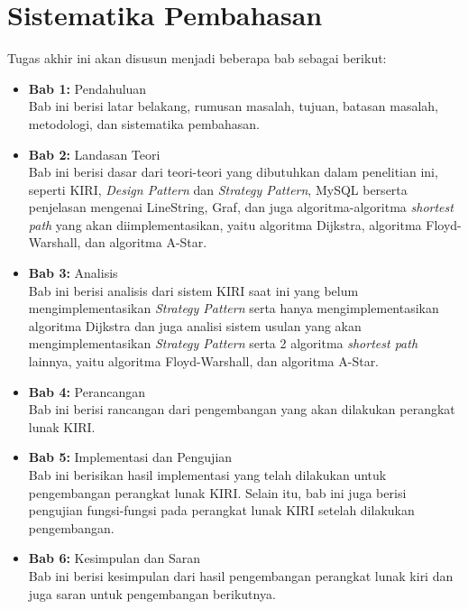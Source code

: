 \section{Sistematika Pembahasan}
\label{sec:sispem}
Tugas akhir ini akan disusun menjadi beberapa bab sebagai berikut:
\begin{itemize}
    \item \textbf{Bab 1:} Pendahuluan
    \\ Bab ini berisi latar belakang, rumusan masalah, tujuan, batasan masalah, metodologi, dan sistematika pembahasan.
    \item \textbf{Bab 2:} Landasan Teori
    \\ Bab ini berisi dasar dari teori-teori yang dibutuhkan dalam penelitian ini, seperti KIRI, \textit{Design Pattern} dan \textit{Strategy Pattern}, MySQL berserta penjelasan mengenai LineString, Graf, dan juga algoritma-algoritma \textit{shortest path} yang akan diimplementasikan, yaitu algoritma Dijkstra, algoritma Floyd-Warshall, dan algoritma A-Star.
    \item \textbf{Bab 3:} Analisis
    \\ Bab ini berisi analisis dari sistem KIRI saat ini yang belum mengimplementasikan \textit{Strategy Pattern} serta hanya mengimplementasikan algoritma Dijkstra dan juga analisi sistem usulan yang akan mengimplementasikan \textit{Strategy Pattern} serta 2 algoritma \textit{shortest path} lainnya, yaitu algoritma Floyd-Warshall, dan algoritma A-Star. 
    \item \textbf{Bab 4:} Perancangan
    \\ Bab ini berisi rancangan dari pengembangan yang akan dilakukan perangkat lunak KIRI.
    \item \textbf{Bab 5:} Implementasi dan Pengujian
    \\ Bab ini berisikan hasil implementasi yang telah dilakukan untuk pengembangan perangkat lunak KIRI. Selain itu, bab ini juga berisi pengujian fungsi-fungsi pada perangkat lunak KIRI setelah dilakukan pengembangan.
    \item \textbf{Bab 6:} Kesimpulan dan Saran
    \\ Bab ini berisi kesimpulan dari hasil pengembangan perangkat lunak kiri dan juga saran untuk pengembangan berikutnya.
        
\end{itemize}
